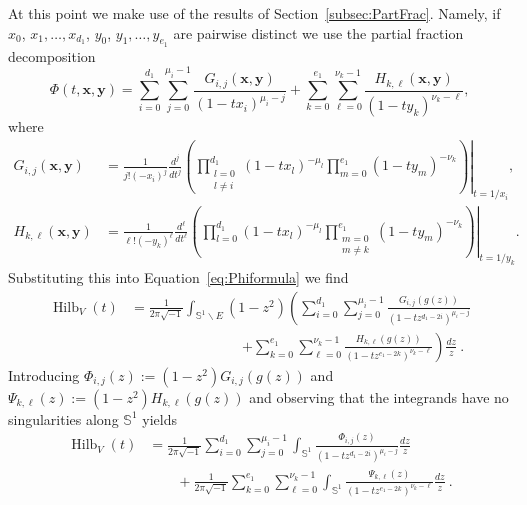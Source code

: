 \documentclass{amsart}
\theoremstyle{definition}
\theoremstyle{remark}
\newcommand{\Sp}{\mathbb{S}}
\newcommand{\bs}{\boldsymbol}
\newcommand{\Hilb}{\operatorname{Hilb}}
\begin{document}
At this point we make use of  the results of Section~\ref{subsec:PartFrac}. Namely, if
$x_0$, $x_1,\ldots,x_{d_1}$, $y_0$, $y_1,\ldots,y_{e_1}$ are pairwise distinct we use the partial
fraction decomposition
\[
    \Phi(t,\bs x, \bs y)=\sum_{i=0}^{d_1}\sum_{j=0}^{\mu_i-1}
        \frac{G_{i,j}(\bs x, \bs y)}{(1-tx_i)^{\mu_i-j}}
        + \sum_{k=0}^{e_1}\sum_{\ell=0}^{\nu_k-1}
        \frac{H_{k,\ell}(\bs x, \bs y)}{(1-ty_k)^{\nu_k-\ell}},
\]
where
\begin{align*}
    G_{i,j}(\bs x, \bs y)
        &=  \frac{1}{j!(-x_i)^j}\frac{d^j}{dt^j}
            \left.\left({\prod\limits_{\substack{l=0\\l\ne i}}^{d_1}(1-t x_l)^{-\mu_l}
            \prod\limits_{m=0}^{e_1}(1-ty_m)^{-\nu_k} }\right)\right|_{t=1/x_i},
        \\
    H_{k,\ell}(\bs x, \bs y)
        &=  \frac{1}{\ell!(-y_k)^\ell}\frac{d^\ell}{dt^\ell}
            \left.\left({\prod\limits_{l=0}^{d_1}(1-t x_l)^{-\mu_l}
            \prod\limits_{\substack{m=0\\m\ne k}}^{e_1}(1-ty_m)^{-\nu_k}}\right)\right|_{t=1/y_k}.
\end{align*}
Substituting this into Equation~\eqref{eq:Phiformula} we find
\begin{align*}
    \Hilb_{V}(t)
        &=  \frac{1}{2\pi \sqrt{-1}}\int_{\Sp^1\backslash E}
            (1-z^2)\left(\sum_{i=0}^{d_1}\sum_{j=0}^{\mu_i-1}
                \frac{G_{i,j}(g(z))}{(1-tz^{d_1-2i})^{\mu_i-j}}
                \right.
                \\ &\quad\quad\quad\quad\quad\quad\quad\quad \left.
                + \sum_{k=0}^{e_1}\sum_{\ell=0}^{\nu_k-1}
                \frac{H_{k,\ell}(g(z))}{(1-tz^{e_1-2k})^{\nu_k-\ell}}\right)\frac{dz}{z} \: .
\end{align*}
Introducing $\Phi_{i,j}(z):=(1-z^2)G_{i,j}(g(z))$ and $\Psi_{k,\ell}(z):=(1-z^2)H_{k,\ell}(g(z))$ and observing that
the integrands have no singularities along $\Sp^1$ yields
\begin{align}
\label{eq:Phi2}
    \Hilb_{V}(t)
        &=\frac{1}{2\pi \sqrt{-1}}
        \sum_{i=0}^{d_1}\sum_{j=0}^{\mu_i-1}
            \int_{\Sp^1}\frac{\Phi_{i,j}(z)}{(1-tz^{d_1-2i})^{\mu_i-j}}\frac{dz}{z}
    \\ \nonumber &\quad\quad
        +\frac{1}{2\pi \sqrt{-1}}
        \sum_{k=0}^{e_1} \sum_{\ell=0}^{\nu_k-1}
            \int_{\Sp^1}\frac{\Psi_{k,\ell}(z)}{(1-tz^{e_1-2k})^{\nu_k-\ell}}\frac{dz}{z} \: .
\end{align}
\end{document}
